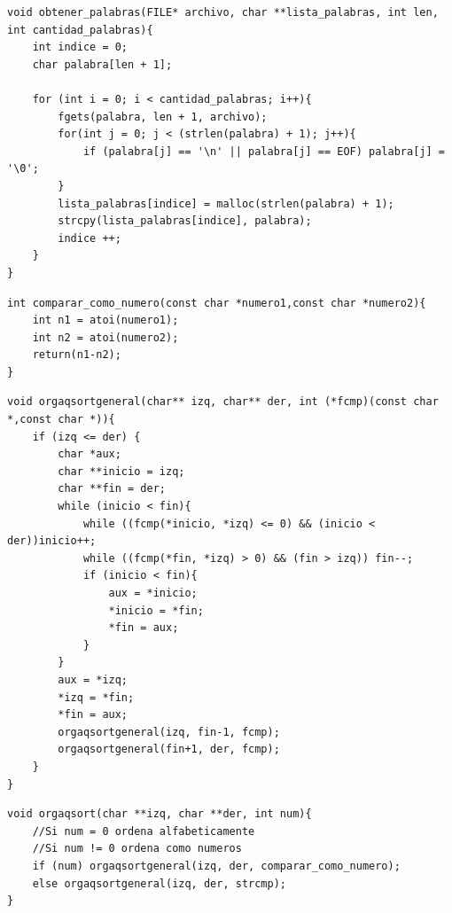 \documentclass[a4paper, 12pt]{article}
\begin{document}
	\begin{lstlisting}
void obtener_palabras(FILE* archivo, char **lista_palabras, int len, int cantidad_palabras){
    int indice = 0;
    char palabra[len + 1];

    for (int i = 0; i < cantidad_palabras; i++){
        fgets(palabra, len + 1, archivo);
        for(int j = 0; j < (strlen(palabra) + 1); j++){
            if (palabra[j] == '\n' || palabra[j] == EOF) palabra[j] = '\0';
        }
        lista_palabras[indice] = malloc(strlen(palabra) + 1);
        strcpy(lista_palabras[indice], palabra);
        indice ++;
    }
}
	\end{lstlisting}
	
	\begin{lstlisting}
int comparar_como_numero(const char *numero1,const char *numero2){
    int n1 = atoi(numero1);
    int n2 = atoi(numero2);
    return(n1-n2);
}
	\end{lstlisting}
	
	\begin{lstlisting}
void orgaqsortgeneral(char** izq, char** der, int (*fcmp)(const char *,const char *)){
    if (izq <= der) {
        char *aux;
        char **inicio = izq;
        char **fin = der;
        while (inicio < fin){
            while ((fcmp(*inicio, *izq) <= 0) && (inicio < der))inicio++;
            while ((fcmp(*fin, *izq) > 0) && (fin > izq)) fin--;
            if (inicio < fin){
                aux = *inicio;
                *inicio = *fin;
                *fin = aux;
            }
        }
        aux = *izq;
        *izq = *fin;
        *fin = aux;
        orgaqsortgeneral(izq, fin-1, fcmp);
        orgaqsortgeneral(fin+1, der, fcmp);
    }
}
	\end{lstlisting}
	
	\begin{lstlisting}
void orgaqsort(char **izq, char **der, int num){
    //Si num = 0 ordena alfabeticamente
    //Si num != 0 ordena como numeros
    if (num) orgaqsortgeneral(izq, der, comparar_como_numero);
    else orgaqsortgeneral(izq, der, strcmp);
}
	\end{lstlisting}
	
\end{document}
